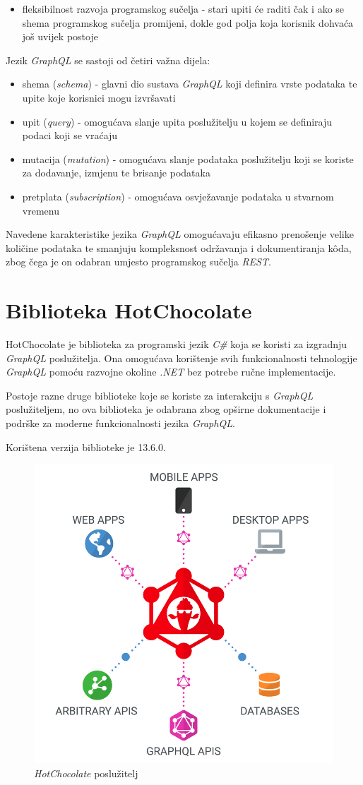 \documentclass[zavrsnirad]{fer}
\begin{document}
\begin{itemize}
  	\item {fleksibilnost razvoja programskog sučelja} - stari upiti će raditi čak i ako se shema programskog sučelja promijeni, dokle god polja koja korisnik dohvaća još uvijek postoje
 \end{itemize}

Jezik \textit{GraphQL} se sastoji od četiri važna dijela:
\begin{itemize}
	\item shema (\textit{schema}) - glavni dio sustava \textit{GraphQL} koji definira vrste podataka te upite koje korisnici mogu izvršavati
	\item upit (\textit{query}) - omogućava slanje upita poslužitelju u kojem se definiraju podaci koji se vraćaju
	\item mutacija (\textit{mutation}) - omogućava slanje podataka poslužitelju koji se koriste za dodavanje, izmjenu te brisanje podataka
	\item pretplata (\textit{subscription}) - omogućava osvježavanje podataka u stvarnom vremenu
\end{itemize}

Navedene karakteristike jezika \textit{GraphQL} omogućavaju efikasno prenošenje velike količine podataka te smanjuju kompleksnost održavanja i dokumentiranja kôda, zbog čega je on odabran umjesto programskog sučelja \textit{REST}.

\section{Biblioteka HotChocolate}
\label{pog:hotchocolate}
HotChocolate je biblioteka za programski jezik \textit{C\#} koja se koristi za izgradnju \textit{GraphQL} poslužitelja. Ona omogućava korištenje svih funkcionalnosti tehnologije \textit{GraphQL} pomoću razvojne okoline \textit{.NET} bez potrebe ručne implementacije.

Postoje razne druge biblioteke koje se koriste za interakciju s \textit{GraphQL} poslužiteljem, no ova biblioteka je odabrana zbog opširne dokumentacije i podrške za moderne funkcionalnosti jezika \textit{GraphQL}.

Korištena verzija biblioteke je 13.6.0.
\begin{figure}[htb]
	\centering
	\includegraphics[width=0.6\linewidth]{images/hot_chocolate.png} 
	\caption{\textit{HotChocolate} poslužitelj \cite{hotchocolate_doc}}
	\label{slk:hot_chooclate}
\end{figure}
\FloatBarrier
\end{document}
